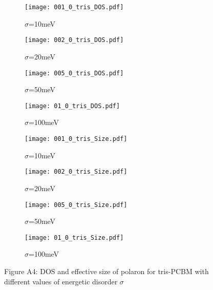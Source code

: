 \documentclass[a4paper,12pt]{article}
\begin{document}
\begin{figure}[H]
\centering
\begin{subfigure}[b]{0.24\textwidth}
\texttt{[image: 001\_0\_tris\_DOS.pdf]}
\caption{$\sigma$=10meV}
\end{subfigure}
\begin{subfigure}[b]{0.24\textwidth}
\texttt{[image: 002\_0\_tris\_DOS.pdf]}
\caption{$\sigma$=20meV}
\end{subfigure}
\begin{subfigure}[b]{0.24\textwidth}
\texttt{[image: 005\_0\_tris\_DOS.pdf]}
\caption{$\sigma$=50meV}
\end{subfigure}
\begin{subfigure}[b]{0.24\textwidth}
\texttt{[image: 01\_0\_tris\_DOS.pdf]}
\caption{$\sigma$=100meV}
\end{subfigure}
\begin{subfigure}[b]{0.24\textwidth}
\texttt{[image: 001\_0\_tris\_Size.pdf]}
\caption{$\sigma$=10meV}
\end{subfigure}
\begin{subfigure}[b]{0.24\textwidth}
\texttt{[image: 002\_0\_tris\_Size.pdf]}
\caption{$\sigma$=20meV}
\end{subfigure}
\begin{subfigure}[b]{0.24\textwidth}
\texttt{[image: 005\_0\_tris\_Size.pdf]}
\caption{$\sigma$=50meV}
\end{subfigure}
\begin{subfigure}[b]{0.24\textwidth}
\texttt{[image: 01\_0\_tris\_Size.pdf]}
\caption{$\sigma$=100meV}
\end{subfigure}
\caption*{Figure A4: DOS and effective size of polaron for tris-PCBM with different values of energetic disorder $\sigma$}
\label{fig:dist}
\end{figure}
\end{document}

